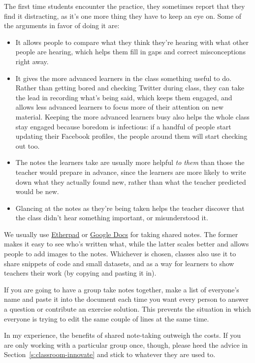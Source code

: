 The first time students encounter the practice, they sometimes report
that they find it distracting, as it's one more thing they have to keep
an eye on. Some of the arguments in favor of doing it are:

\begin{itemize}
\item
  It allows people to compare what they think they're hearing with
  what other people are hearing, which helps them fill in gaps and
  correct misconceptions right away.
\item
  It gives the more advanced learners in the class something useful to
  do. Rather than getting bored and checking Twitter during class,
  they can take the lead in recording what's being said, which keeps
  them engaged, and allows less advanced learners to focus more of
  their attention on new material. Keeping the more advanced learners
  busy also helps the whole class stay engaged because boredom is
  infectious: if a handful of people start updating their Facebook
  profiles, the people around them will start checking out too.
\item
  The notes the learners take are usually more helpful \emph{to them} than
  those the teacher would prepare in advance, since the learners are
  more likely to write down what they actually found new, rather than
  what the teacher predicted would be new.
\item
  Glancing at the notes as they're being taken helps the teacher
  discover that the class didn't hear something important, or
  misunderstood it.
\end{itemize}

We usually use \href{http://etherpad.org}{Etherpad} or \href{http://docs.google.com}{Google Docs} for
taking shared notes. The former makes it easy to see who's written
what, while the latter scales better and allows people to add images
to the notes. Whichever is chosen, classes also use it to share
snippets of code and small datasets, and as a way for learners to show
teachers their work (by copying and pasting it in).

If you are going to have a group take notes together, make a list of
everyone's name and paste it into the document each time you want every
person to answer a question or contribute an exercise solution. This
prevents the situation in which everyone is trying to edit the same
couple of lines at the same time.

In my experience, the benefits of shared note-taking outweigh the costs.
If you are only working with a particular group once, though, please
heed the advice in Section~\ref{s:classroom-innovate} and stick to
whatever they are used to.

